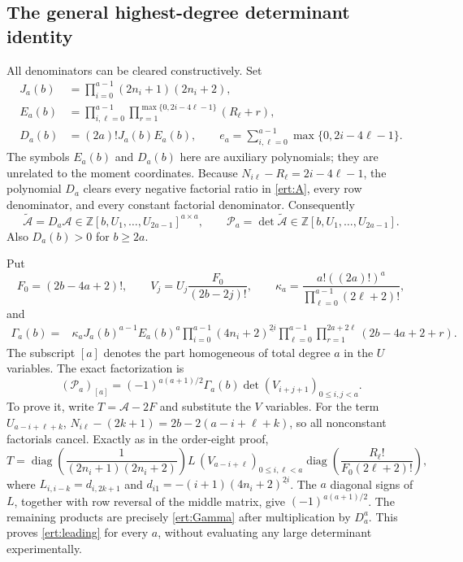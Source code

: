 \documentclass[11pt,a4paper]{article}
\numberwithin{equation}{section}
\theoremstyle{plain}
\theoremstyle{definition}
\theoremstyle{remark}
\begin{document}
\subsection{The general highest-degree determinant identity}

All denominators can be cleared constructively. Set
\begin{align*}
 J_a(b)&=\prod_{i=0}^{a-1}(2n_i+1)(2n_i+2),\\
 E_a(b)&=\prod_{i,\ell=0}^{a-1}
           \prod_{r=1}^{\max\{0,2i-4\ell-1\}}(R_\ell+r),\\
 D_a(b)&=(2a)!J_a(b)E_a(b),\qquad
 e_a=\sum_{i,\ell=0}^{a-1}\max\{0,2i-4\ell-1\}.
\end{align*}
The symbols $E_a(b)$ and $D_a(b)$ here are auxiliary polynomials;
they are unrelated to the moment coordinates.
Because $N_{i\ell}-R_\ell=2i-4\ell-1$, the polynomial $D_a$
clears every negative factorial ratio in \eqref{ert:A}, every
row denominator, and every constant factorial denominator.
Consequently
\[
 \widetilde{\mathcal A}=D_a\mathcal A
       \in\mathbb Z[b,U_1,\ldots,U_{2a-1}]^{a\times a},
 \qquad \mathscr P_a=\det\widetilde{\mathcal A}
       \in\mathbb Z[b,U_1,\ldots,U_{2a-1}].
\]
Also $D_a(b)>0$ for $b\ge2a$.

Put
\[
 F_0=(2b-4a+2)!,\qquad
 V_j=U_j\frac{F_0}{(2b-2j)!},\qquad
 \kappa_a=\frac{a!((2a)!)^a}{\prod_{\ell=0}^{a-1}(2\ell+2)!},
\]
and
\begin{align}
 \Gamma_a(b)={}&\kappa_aJ_a(b)^{a-1}E_a(b)^a
 \prod_{i=0}^{a-1}(4n_i+2)^{\underline{2i}}
 \prod_{\ell=0}^{a-1}\prod_{r=1}^{2a+2\ell}(2b-4a+2+r).
 \label{ert:Gamma}
\end{align}
The subscript $[a]$ denotes the part homogeneous of total degree
$a$ in the $U$ variables. The exact factorization is
\begin{equation}\label{ert:leading}
 (\mathscr P_a)_{[a]}
 =(-1)^{a(a+1)/2}\Gamma_a(b)
           \det(V_{i+j+1})_{0\le i,j<a}.
\end{equation}
To prove it, write $T=\mathcal A-2F$ and substitute the $V$ variables.
For the term $U_{a-i+\ell+k}$,
$N_{i\ell}-(2k+1)=2b-2(a-i+\ell+k)$, so all nonconstant
factorials cancel. Exactly as in the order-eight proof,
\[
 T=\operatorname{diag}\!\left(\frac1{(2n_i+1)(2n_i+2)}\right)
    L\,(V_{a-i+\ell})_{0\le i,\ell<a}
    \operatorname{diag}\!\left(\frac{R_\ell!}{F_0(2\ell+2)!}\right),
\]
where $L_{i,i-k}=d_{i,2k+1}$ and
$d_{i1}=-(i+1)(4n_i+2)^{\underline{2i}}$.
The $a$ diagonal signs of $L$, together with row reversal of the
middle matrix, give $(-1)^{a(a+1)/2}$. The remaining products are
precisely \eqref{ert:Gamma} after multiplication by $D_a^a$.
This proves \eqref{ert:leading} for every $a$, without evaluating
any large determinant experimentally.
\end{document}
